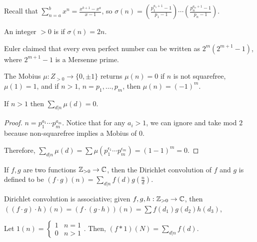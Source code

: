 \documentclass{article}
\begin{document}
Recall that $\sum_{n = a}^b x^n = \frac{x^{b + 1} - x^a}{x - 1}$, so $\sigma(n) = \left(\frac{p_1^{a_1 + 1} - 1}{p_1 - 1}\right) \cdots \left(\frac{p_n^{a_n + 1} - 1}{p_n - 1}\right)$.

\begin{definition}
    An integer $> 0$ is  if $\sigma(n) = 2n$.
\end{definition}

Euler claimed that every even perfect number can be written as $2^m(2^{m + 1} - 1)$, where $2^{m + 1} - 1$ is a Mersenne prime.

\begin{definition}
    The Mobius $\mu : Z_{> 0} \to \{0, \pm 1\}$ returns $\mu(n) = 0$ if $n$ is not squarefree, $\mu(1) = 1$, and if $n > 1$, $n = p_1, \ldots, p_m$, then $\mu(n) = (-1)^m$.
\end{definition}

\begin{proposition}
    If $n > 1$ then $\sum_{d | n} \mu(d) = 0$.
\end{proposition}

\begin{proof}
    $n = p_1^{a_1} \cdots p_m^{a_m}$. Notice that for any $a_i > 1$, we can ignore and take mod $2$ because non-squarefree implies a Mobius of $0$.
    
    Therefore, $\sum_{d|n} \mu(d) = \sum \mu(p_1^{\epsilon_1} \cdots p_m^{\epsilon_m}) = (1 - 1)^m = 0$.
\end{proof}

\begin{definition}
    If $f, g$ are two functions $\mathbb Z_{> 0} \to \mathbb C$, then the Dirichlet convolution of $f$ and $g$ is defined to be $(f \cdot g)(n) = \sum_{d | n} f(d)g(\frac{n}{d})$.
\end{definition}

\begin{remark}
    Dirichlet convolution is associative; given $f, g, h : \mathbb Z_{> 0} \to \mathbb C$, then $((f \cdot g) \cdot h)(n) = (f \cdot (g \cdot h))(n) = \sum f(d_1) g(d_2) h(d_3)$,
\end{remark}

\begin{definition}
    Let $1(n) = \begin{cases}1 & n = 1 \\ 0 & n > 1\end{cases}$. Then, $(f * 1)(N) = \sum_{d | n} f(d)$. 
\end{definition}
\end{document}
